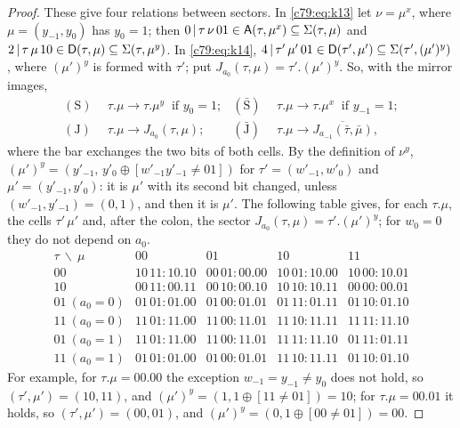 \begin{proof}
These give four relations between sectors. In \eqref{c79:eq:k13} let $\nu=\mu^x$, where $\mu=(y_{-1},y_0)$ has $y_0=1$; then $0\,|\,\tau\,\nu\,01\in\mathsf A(\tau,\mu^x)\subseteq\Sigma(\tau,\mu)$ and $2\,|\,\tau\,\mu\,10\in\mathsf D(\tau,\mu)\subseteq\Sigma(\tau,\mu^y)$. In \eqref{c79:eq:k14}, $4\,|\,\tau'\,\mu'\,01\in\mathsf D(\tau',\mu')\subseteq\Sigma(\tau',(\mu')^y)$, where $(\mu')^y$ is formed with $\tau'$; put $J_{a_0}(\tau,\mu)=\tau'.(\mu')^y$. So, with the mirror images,
\begin{align*}
(\mathrm S)\ \ &\tau.\mu\to\tau.\mu^y\ \text{ if }y_0=1;&(\bar{\mathrm S})\ \ &\tau.\mu\to\tau.\mu^x\ \text{ if }y_{-1}=1;\\
(\mathrm J)\ \ &\tau.\mu\to J_{a_0}(\tau,\mu);&(\bar{\mathrm J})\ \ &\tau.\mu\to\overline{J_{a_{-1}}(\bar\tau,\bar\mu)},
\end{align*}
where the bar exchanges the two bits of both cells. By the definition of $\nu^y$, $(\mu')^y=(y'_{-1},\,y'_0\oplus[w'_{-1}y'_{-1}\ne01])$ for $\tau'=(w'_{-1},w'_0)$ and $\mu'=(y'_{-1},y'_0)$: it is $\mu'$ with its second bit changed, unless $(w'_{-1},y'_{-1})=(0,1)$, and then it is $\mu'$. The following table gives, for each $\tau.\mu$, the cells $\tau'\,\mu'$ and, after the colon, the sector $J_{a_0}(\tau,\mu)=\tau'.(\mu')^y$; for $w_0=0$ they do not depend on $a_0$.
\[
\begin{array}{l|cccc}
\tau\ \backslash\ \mu&00&01&10&11\\\hline
00&10\,11\colon10.10&00\,01\colon00.00&10\,01\colon10.00&10\,00\colon10.01\\
10&00\,11\colon00.11&00\,10\colon00.10&10\,10\colon10.11&00\,00\colon00.01\\
01\ (a_0=0)&01\,01\colon01.00&01\,00\colon01.01&01\,11\colon01.11&01\,10\colon01.10\\
11\ (a_0=0)&11\,01\colon11.00&11\,00\colon11.01&11\,10\colon11.11&11\,11\colon11.10\\
01\ (a_0=1)&11\,01\colon11.00&11\,00\colon11.01&11\,11\colon11.10&01\,11\colon01.11\\
11\ (a_0=1)&01\,01\colon01.00&01\,00\colon01.01&11\,10\colon11.11&01\,10\colon01.10
\end{array}
\]
For example, for $\tau.\mu=00.00$ the exception $w_{-1}=y_{-1}\ne y_0$ does not hold, so $(\tau',\mu')=(10,11)$, and $(\mu')^y=(1,1\oplus[11\ne01])=10$; for $\tau.\mu=00.01$ it holds, so $(\tau',\mu')=(00,01)$, and $(\mu')^y=(0,1\oplus[00\ne01])=00$.


\end{proof}
